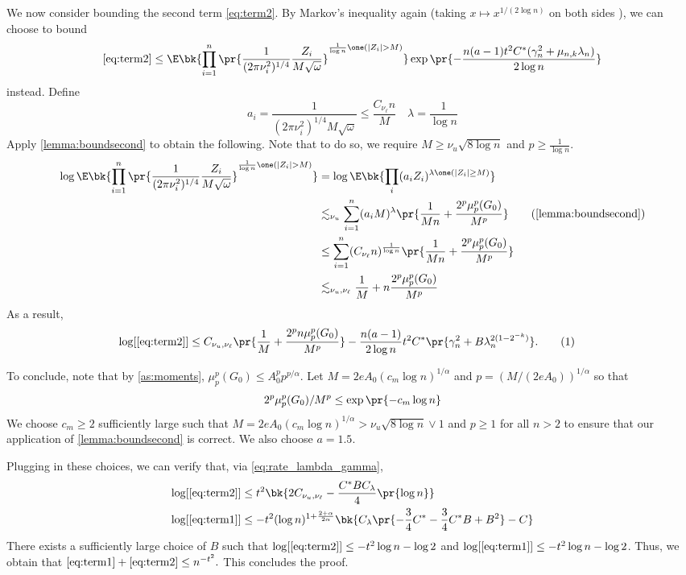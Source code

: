 \documentclass[12pt, reqno]{amsart}
\newcommand\numberthis{\addtocounter{equation}{1}\tag{\theequation}}
\numberwithin{equation}{section}
\begin{document}
\begin{refsection}
\begin{appendices}
We now consider bounding the second term \eqref{eq:term2}. By Markov's inequality again
(taking $x \mapsto x^{1/(2\log n)}$ on both sides
),
we can choose to bound \[
\eqref{eq:term2} \le \E\bk{
    \prod_{i=1}^n \pr{\frac{1}{(2\pi \nu_i^2)^{1/4}} \frac{Z_i}{M \sqrt{\omega}}
}^{\frac{1}{\log n} \one(|Z_i| > M)}
} \exp\pr{-\frac{n (a - 1) t^2 C^* (\gamma_n^2 + \mu_{n,k} \lambda_n)}{2\log n}}
\]
instead. Define \[
a_i = \frac{1}{(2\pi \nu_i^2)^{1/4} M \sqrt{\omega}} \le  \frac{C_{\nu_\ell}n}{M} \quad
\lambda = \frac{1}{\log n}
\]
Apply \cref{lemma:boundsecond} to obtain the following. Note that to do so, we require $ M
\ge \nu_u \sqrt{8\log n}$ and $p \ge \frac{1}{\log n}. $
\begin{align*}
\log \E\bk{
    \prod_{i=1}^n \pr{\frac{1}{(2\pi \nu_i^2)^{1/4}} \frac{Z_i}{M \sqrt{\omega}}
}^{\frac{1}{\log n} \one(|Z_i| > M)}}
&= \log \E\bk{\prod_i (a_i Z_i)^{ \lambda \one(|Z_i| \ge M) }
}
\\
&\lesssim_{\nu_u} \sum_{i=1}^n (a_i M)^{\lambda} \pr{\frac{1}{Mn} + \frac{2^p \mu_p^p
(G_0)}{M^p}} 
\tag{\cref{lemma:boundsecond}}
\\
&\le \sum_{i=1}^n (C_{\nu_\ell} n)^{\frac{1}{\log n}} \pr{\frac{1}{Mn} + \frac{2^p \mu_p^p
(G_0)}{M^p}}
\\
&\lesssim_{\nu_u, \nu_\ell} \frac{1}{M} +  n \frac{2^p \mu_p^p
(G_0)}{M^p}
\end{align*}
As a result,
\begin{align*}
\log [\eqref{eq:term2}] & \le C_{\nu_u, \nu_\ell} \pr{\frac{1}{M} + \frac{2^p n \mu_p^p
(G_0)}{M^p}} -  \frac{n (a-1) }{2\log n} t^2 C^* \pr{\gamma_n^2 + B \lambda_n^{2(1-2^
{-k})}}. \numberthis \label{eq:second_bound_log}
\end{align*}

To conclude, note that by \cref{as:moments}, $\mu_p^p(G_0) \le A_0^p p^{p/\alpha}$. Let $M = 2e A_0 (c_m \log
n)^{1/\alpha}$ and $p = (M / (2eA_0))^{1/\alpha}$ so that \[
2^p \mu_p^p(G_0) / M^p \le \exp\pr{-c_m \log n}
\]
We choose $c_m \ge 2$ sufficiently large such that $M = 2e A_0 (c_m \log n)^{1/\alpha} >
\nu_u
\sqrt{8 \log n} \vee 1$ and $p \ge 1$ for all $n > 2$ to ensure that our application of
\cref{lemma:boundsecond} is correct. We also choose $a = 1.5$.

Plugging in these choices, we can verify that, via \eqref{eq:rate_lambda_gamma},
\begin{align*}
\log [\eqref{eq:term2}] &\le t^2 \bk{
    2 C_{\nu_u, \nu_\ell} - \frac{C^* B C_\lambda}{4} \pr{\log n}
} \\ 
\log [\eqref{eq:term1}] &\le -t^2 (\log n)^{1+\frac{2+\alpha}{2\alpha}}\bk{ C_\lambda \pr{-\frac{3}{4}C^* -
\frac{3}
{4}C^*B + B^2} - C}
\end{align*}
There exists a sufficiently large choice of $B$ such that $\log [\eqref{eq:term2}] \le
-t^2 \log n - \log 2$ and $\log [\eqref{eq:term1}] \le -t^2 \log n - \log 2$.  Thus, we
obtain that
$
\eqref{eq:term1} + \eqref{eq:term2} \le n^{-t^2}.
$
This concludes the proof.






\end{appendices}
\end{refsection}
\end{document}
